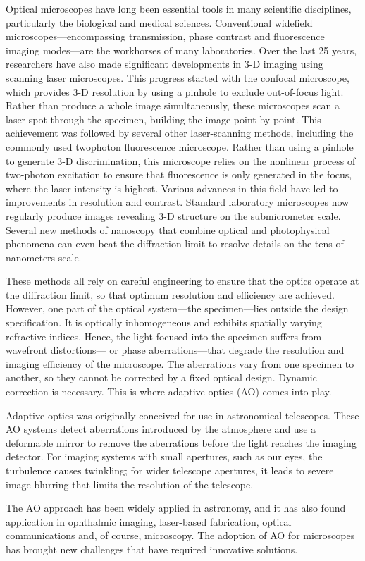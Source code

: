 \cite{AOM_basic_ref}

Optical microscopes have long been essential tools in many scientific disciplines, particularly the biological and medical sciences. Conventional widefield microscopes—encompassing transmission, phase contrast and fluorescence imaging modes—are the workhorses of many laboratories. Over the last 25 years, researchers have also made significant developments in 3-D imaging using scanning laser microscopes. This progress started with the confocal microscope, which provides 3-D resolution by using a pinhole to exclude out-of-focus light. Rather than produce a whole image simultaneously, these microscopes scan a laser spot through the specimen, building the image point-by-point. This achievement was followed by several other laser-scanning methods, including the commonly used twophoton fluorescence microscope. Rather than using a pinhole to generate 3-D discrimination, this microscope relies on the nonlinear process of two-photon excitation to ensure that fluorescence is only generated in the focus, where the laser intensity is highest. Various advances in this field have led to improvements in resolution and contrast. Standard laboratory microscopes now regularly produce images revealing 3-D structure on the submicrometer scale. Several new methods of nanoscopy that combine optical and photophysical phenomena can even beat the diffraction limit to resolve details on the tens-of-nanometers scale.
 
These methods all rely on careful engineering to ensure that the optics operate at the diffraction limit, so that optimum resolution and efficiency are achieved. However, one part of the optical system—the specimen—lies outside the design specification. It is optically inhomogeneous and exhibits spatially varying refractive indices. Hence, the light focused into the specimen suffers from wavefront distortions— or phase aberrations—that degrade the resolution and imaging efficiency of the microscope. The aberrations vary from one specimen to another, so they cannot be corrected by a fixed optical design. Dynamic correction is necessary. This is where adaptive optics (AO) comes into play. 

Adaptive optics was originally conceived for use in astronomical telescopes. These AO systems detect aberrations introduced by the atmosphere and use a deformable mirror to remove the aberrations before the light reaches the imaging detector. For imaging systems with small apertures, such as our eyes, the turbulence causes twinkling; for wider telescope apertures, it leads to severe image blurring that limits the resolution of the telescope. 

The AO approach has been widely applied in astronomy, and it has also found application in ophthalmic imaging, laser-based fabrication, optical communications and, of course, microscopy. The adoption of AO for microscopes has brought new challenges that have required innovative solutions.

\cite{AOM_biomedical}

\clearpage
